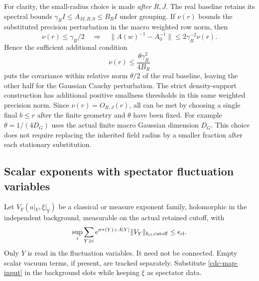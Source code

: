 For clarity, the small-radius choice is made \emph{after} $R,J$.
The real baseline retains its spectral bounds
$\gamma_R I\leq A_{M,R,0}\leq B_RI$ under grouping. If
$\nu(r)$ bounds the substituted precision perturbation in the
macro weighted row norm, then
\begin{equation}
 \nu(r)\leq\gamma_R/2
 \quad\Longrightarrow\quad
 \|A(w)^{-1}-A_0^{-1}\|
             \leq2\gamma_R^{-2}\nu(r).
 \label{cdc-covariance-comparison}
\end{equation}
Hence the sufficient additional condition
\begin{equation}
 \nu(r)\leq\frac{\theta\gamma_R^2}{4B_R}
 \label{cdc-relative-neighborhood}
\end{equation}
puts the covariance within relative norm $\theta/2$ of the real
baseline, leaving the other half for the Gaussian Cauchy
perturbation. The strict density-support construction has
additional positive smallness thresholds in this same weighted
precision norm. Since $\nu(r)=O_{R,J}(r)$, all can be met by
choosing a single final $b\leq r$ after the finite geometry and
$\theta$ have been fixed. For example
$\theta=1/(4D_G)$ uses the actual finite macro Gaussian
dimension $D_G$. This choice does not require replacing the
inherited field radius by a smaller fraction after each
stationary substitution.

\subsection{Scalar exponents with spectator fluctuation variables}
\label{cdc-scalar-section}

Let $V_Y(a|_Y,\xi|_Y)$ be a classical or measure exponent family,
holomorphic in the independent background, measurable on the
actual retained cutoff, with
\begin{equation}
 \sup_i\sum_{Y\ni i}e^{\sigma\tau(Y)+A|Y|}
             \|V_Y\|_{b_{\rm cl},{\rm cutoff}}
 \leq\epsilon_{\rm cl}.
 \label{cdc-scalar-input}
\end{equation}
Only $Y$ is read in the fluctuation variables. It need not be
connected. Empty scalar vacuum terms, if present, are tracked
separately. Substitute \eqref{cdc-map-input} in the background
slots while keeping $\xi$ as spectator data.

